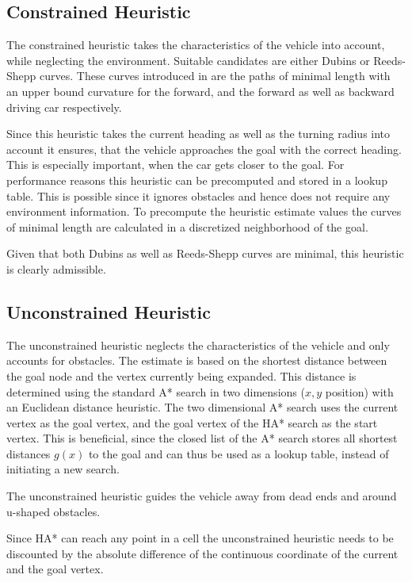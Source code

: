 \subsection{Constrained Heuristic}
The constrained heuristic takes the characteristics of the vehicle into account, while neglecting the environment. Suitable candidates are either Dubins or Reeds-Shepp curves. These curves introduced in  are the paths of minimal length with an upper bound curvature for the forward, and the forward as well as backward driving car respectively.

Since this heuristic takes the current heading as well as the turning radius into account it ensures, that the vehicle approaches the goal with the correct heading. This is especially important, when the car gets closer to the goal. For performance reasons this heuristic can be precomputed and stored in a lookup table. This is possible since it ignores obstacles and hence does not require any environment information. To precompute the heuristic estimate values the curves of minimal length are calculated in a discretized neighborhood of the goal.

Given that both Dubins as well as Reeds-Shepp curves are minimal, this heuristic is clearly admissible.

\subsection{Unconstrained Heuristic}
The unconstrained heuristic neglects the characteristics of the vehicle and only accounts for obstacles. The estimate is based on the shortest distance between the goal node and the vertex currently being expanded. This distance is determined using the standard A* search in two dimensions ($x,y$ position) with an Euclidean distance heuristic.
The two dimensional A* search uses the current vertex as the goal vertex, and the goal vertex of the HA* search as the start vertex. This is beneficial, since the closed list of the A* search stores all shortest distances $g(x)$ to the goal and can thus be used as a lookup table, instead of initiating a new search.

The unconstrained heuristic guides the vehicle away from dead ends and around u-shaped obstacles.

Since HA* can reach any point in a cell the unconstrained heuristic needs to be discounted by the absolute difference of the continuous coordinate of the current and the goal vertex.

